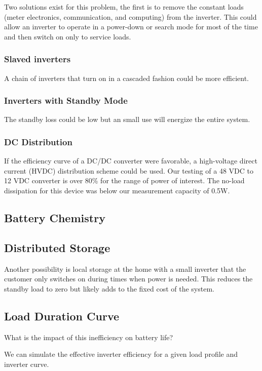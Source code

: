 \documentclass[conference]{IEEEtran}
\begin{document}
Two solutions exist for this problem, the first is to remove
the constant loads (meter electronics, communication, and
computing) from the inverter.
This could allow an inverter to operate in a power-down or
search mode for most of the time and then switch on only
to service loads.

\subsubsection{Slaved inverters}
A chain of inverters that turn on in a cascaded fashion could
be more efficient.

\subsubsection{Inverters with Standby Mode}
The standby loss could be low but an small use will energize the
entire system.

\subsubsection{DC Distribution}
If the efficiency curve of a DC/DC converter were favorable,
a high-voltage direct current (HVDC) distribution scheme could
be used.
Our testing of a 48 VDC to 12 VDC converter is over 80\% for
the range of power of interest.
The no-load dissipation for this device was below our measurement
capacity of 0.5W.

\subsection{Battery Chemistry}

\subsection{Distributed Storage}
Another possibility is local storage at the home with a small inverter
that the customer only switches on during times when power
is needed.
This reduces the standby load to zero but likely adds to the
fixed cost of the system.

\subsection{Load Duration Curve}

What is the impact of this inefficiency on battery life?

We can simulate the effective inverter efficiency for a given
load profile and inverter curve.
\end{document}
